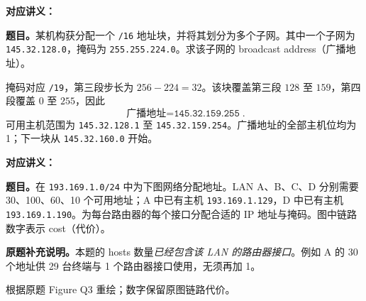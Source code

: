 
\textbf{对应讲义：}

\textbf{题目。}某机构获分配一个 \texttt{/16} 地址块，并将其划分为多个子网。其中一个子网为 \texttt{145.32.128.0}，掩码为 \texttt{255.255.224.0}。求该子网的 broadcast address（广播地址）。

\begin{checkedsolution}
掩码对应 \texttt{/19}，第三段步长为 $256-224=32$。该块覆盖第三段 $128$ 至 $159$，第四段覆盖 $0$ 至 $255$，因此
\[
  \boxed{\text{广播地址}=\texttt{145.32.159.255}}.
\]
可用主机范围为 \texttt{145.32.128.1} 至 \texttt{145.32.159.254}。广播地址的全部主机位均为 1；下一块从 \texttt{145.32.160.0} 开始。
\end{checkedsolution}


\textbf{对应讲义：}

\textbf{题目。}在 \texttt{193.169.1.0/24} 中为下图网络分配地址。LAN A、B、C、D 分别需要 30、100、60、10 个可用地址；A 中已有主机 \texttt{193.169.1.129}，D 中已有主机 \texttt{193.169.1.190}。为每台路由器的每个接口分配合适的 IP 地址与掩码。图中链路数字表示 cost（代价）。

\textbf{原题补充说明。}本题的 hosts 数量\emph{已经包含该 LAN 的路由器接口}。例如 A 的 30 个地址供 29 台终端与 1 个路由器接口使用，无须再加 1。

\begin{center}
  

  {\footnotesize 根据原题 Figure Q3 重绘；数字保留原图链路代价。}
\end{center}


